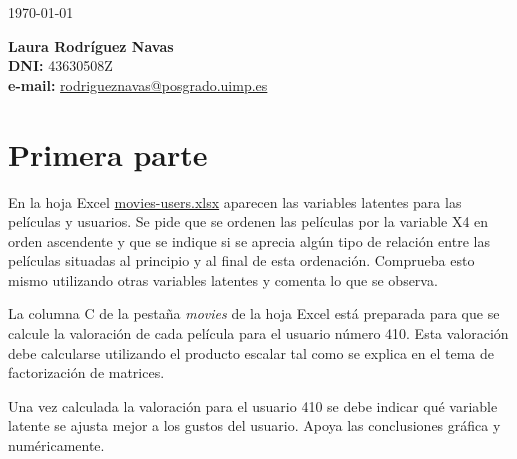 \documentclass{uimppracticas}
\begin{document}
	
\frontmatter


\begin{center}
\large \today
\end{center}

\vspace{40mm}

\begin{flushright}
 	{\bf Laura Rodríguez Navas}\\
 	\textbf{DNI:} 43630508Z\\
 	\textbf{e-mail:} \href{rodrigueznavas@posgrado.uimp.es}{rodrigueznavas@posgrado.uimp.es}
\end{flushright}

\newpage



\mainmatter

\setlength\parskip{2.5ex}

\section*{Primera parte}

En la hoja Excel \href{https://poliformat.upv.es/access/content/group/ESP_0_2827/movies-users.xlsx}{movies-users.xlsx} aparecen las variables latentes para las películas y usuarios. Se pide que se ordenen las películas por la variable X4 en orden ascendente y que se indique si se aprecia algún tipo de relación entre las películas situadas al principio y al final de esta ordenación. Comprueba esto mismo utilizando otras variables latentes y comenta lo que se observa.

La columna C de la pestaña \textit{movies} de la hoja Excel está preparada para que se calcule la valoración de cada película para el usuario número 410. Esta valoración debe calcularse utilizando el producto escalar tal como se explica en el tema de factorización de matrices.

Una vez calculada la valoración para el usuario 410 se debe indicar qué variable latente se ajusta mejor a los gustos del usuario. Apoya las conclusiones gráfica y numéricamente. 
\end{document}
